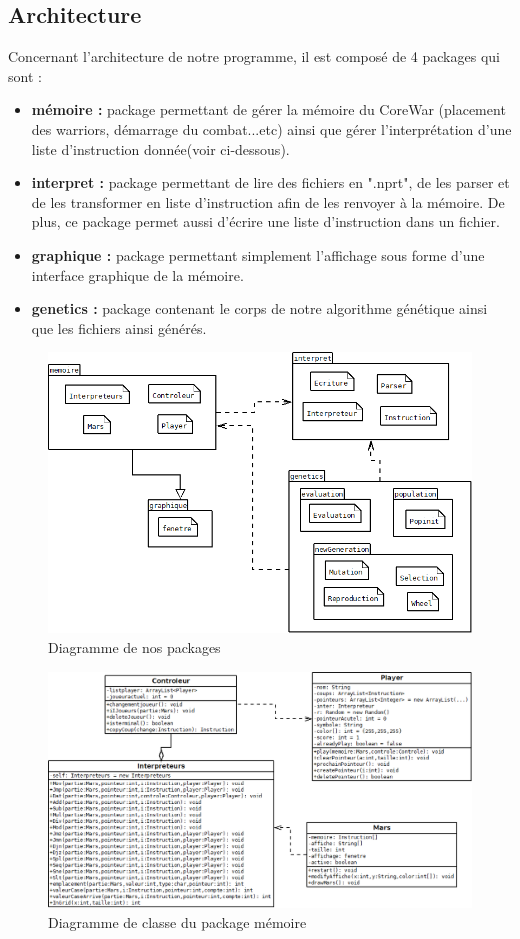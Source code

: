 \documentclass[a4paper,12pt]{article}
\begin{document}
\subsection{Architecture}
Concernant l'architecture de notre programme, il est composé de 4 packages qui sont :\\
\begin{center}
\begin{itemize}
\item \textbf{mémoire :} package permettant de gérer la mémoire du CoreWar (placement des warriors, démarrage du combat...etc) ainsi que gérer l'interprétation d'une liste d'instruction donnée(voir ci-dessous).
\item \textbf{interpret :} package permettant de lire des fichiers en ".nprt", de les parser et de les transformer en liste d'instruction afin de les renvoyer à la mémoire. De plus, ce package permet aussi d'écrire une liste d'instruction dans un fichier.
\item \textbf{graphique :} package permettant simplement l'affichage sous forme d'une interface graphique de la mémoire.
\item \textbf{genetics :} package contenant le corps de notre algorithme génétique ainsi que les fichiers ainsi générés.
\pagebreak
\end{itemize}
\end{center}
\begin{figure}[H]
\includegraphics[scale=0.6]{diagrammepackage.png}
\caption{Diagramme de nos packages}
\end{figure}
\begin{figure}[H]
\includegraphics[scale=0.4]{diagrammememoire.png}
\caption{Diagramme de classe du package mémoire}
\end{figure}
\end{document}
